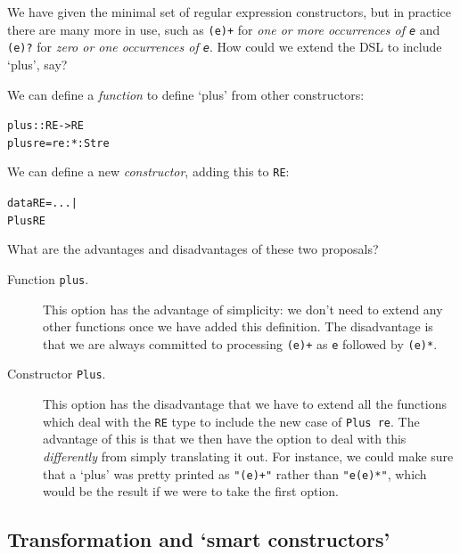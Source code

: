 We have given the minimal set of regular expression constructors, but in practice there are many more in use, such as \texttt{(e)+} for \emph{one or more occurrences of \texttt{e}} and \texttt{(e)?} for \emph{zero or one occurrences of \texttt{e}}. How could we extend the DSL to include `plus', say?
\begin{titemize}
\item
We can define a \emph{function} to define `plus' from other constructors:
\begin{alltt}
plus :: RE -> RE
plus re = re :*: St re
\end{alltt}
\item
We can define a new \emph{constructor}, adding this to \texttt{RE}:
\begin{alltt}
data RE = ... |
          Plus RE
\end{alltt}
\end{titemize}
What are the advantages and disadvantages of these two proposals?
\begin{description}
\item[Function \texttt{plus}.]
This option has the advantage of simplicity: we don't need to extend any other functions  once we have added this definition. The disadvantage is that we are always committed to processing \texttt{(e)+} as \texttt{e} followed by \texttt{(e)*}.
\item[Constructor \texttt{Plus}.]
This option has the disadvantage that we have to extend all the functions which deal with the \texttt{RE} type to include the new case of \texttt{Plus re}. The advantage of this is that we then have the option to deal with this \emph{differently} from simply translating it out. For instance, we could make sure that a `plus' was pretty printed as 
\texttt{"(e)+"} rather than \texttt{"e(e)*"}, which would be the result if we were to take the first option.
\end{description}

\subsection*{Transformation and `smart constructors'}

